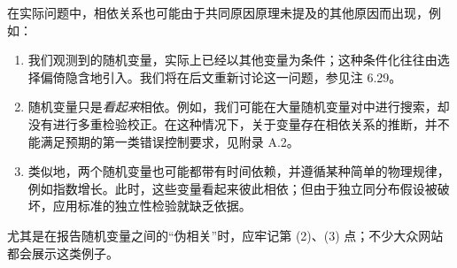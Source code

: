 在实际问题中，相依关系也可能由于共同原因原理未提及的其他原因而出现，例如：
\begin{enumerate}[label=(\arabic*)]
 \item 我们观测到的随机变量，实际上已经以其他变量为条件；这种条件化往往由选择偏倚隐含地引入。我们将在后文重新讨论这一问题，参见注 6.29。
 \item 随机变量只是\emph{看起来}相依。例如，我们可能在大量随机变量对中进行搜索，却没有进行多重检验校正。在这种情况下，关于变量存在相依关系的推断，并不能满足预期的第一类错误控制要求，见附录 A.2。
 \item 类似地，两个随机变量也可能都带有时间依赖，并遵循某种简单的物理规律，例如指数增长。此时，这些变量看起来彼此相依；但由于独立同分布假设被破坏，应用标准的独立性检验就缺乏依据。
\end{enumerate}
尤其是在报告随机变量之间的“伪相关”时，应牢记第 (2)、(3) 点；不少大众网站都会展示这类例子。
